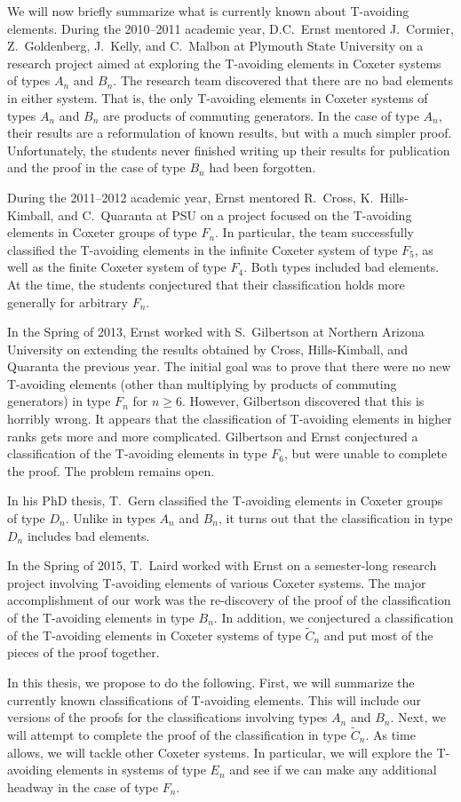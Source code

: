 \documentclass[10pt]{amsart}
\begin{document}
We will now briefly summarize what is currently known about T-avoiding elements.  During the 2010--2011 academic year, D.C.~Ernst mentored J.~Cormier, Z.~Goldenberg, J.~Kelly, and C.~Malbon at Plymouth State University on a research project aimed at exploring the T-avoiding elements in Coxeter systems of types $A_n$ and $B_n$.  The research team discovered that there are no bad elements in either system.  That is, the only T-avoiding elements in Coxeter systems of types $A_n$ and $B_n$ are products of commuting generators.  In the case of type $A_n$, their results are a reformulation of known results, but with a much simpler proof.  Unfortunately, the students never finished writing up their results for publication and the proof in the case of type $B_n$ had been forgotten.  

During the 2011--2012 academic year, Ernst mentored R.~Cross, K.~Hills-Kimball, and C.~Quaranta at PSU on a project focused on the T-avoiding elements in Coxeter groups of type $F_n$.  In particular, the team successfully classified the T-avoiding elements in the infinite Coxeter system of type $F_{5}$, as well as the finite Coxeter system of type $F_{4}$. Both types included bad elements. At the time, the students conjectured that their classification holds more generally for arbitrary $F_{n}$.

In the Spring of 2013, Ernst worked with S.~Gilbertson at Northern Arizona University on extending the results obtained by Cross, Hills-Kimball, and Quaranta the previous year.  The initial goal was to prove that there were no new T-avoiding elements (other than multiplying by products of commuting generators) in type $F_n$ for $n\geq 6$.  However, Gilbertson discovered that this is horribly wrong.  It appears that the classification of T-avoiding elements in higher ranks gets more and more complicated.  Gilbertson and Ernst conjectured a classification of the T-avoiding elements in type $F_6$, but were unable to complete the proof.  The problem remains open.

In his PhD thesis, T.~Gern classified the T-avoiding elements in Coxeter groups of type $D_n$. Unlike in types $A_n$ and $B_n$, it turns out that the classification in type $D_n$ includes bad elements.

In the Spring of 2015, T.~Laird worked with Ernst on a semester-long research project involving T-avoiding elements of various Coxeter systems.  The major accomplishment of our work was the re-discovery of the proof of the classification of the T-avoiding elements in type $B_n$.  In addition, we conjectured a classification of the T-avoiding elements in Coxeter systems of type $\widetilde{C}_n$ and put most of the pieces of the proof together.

In this thesis, we propose to do the following.  First, we will summarize the currently known classifications of T-avoiding elements.  This will include our versions of the proofs for the classifications involving types $A_n$ and $B_n$.  Next, we will attempt to complete the proof of the classification in type $\widetilde{C}_n$. As time allows, we will tackle other Coxeter systems.  In particular, we will explore the T-avoiding elements in systems of type $E_n$ and see if we can make any additional headway in the case of type $F_n$.
\end{document}
